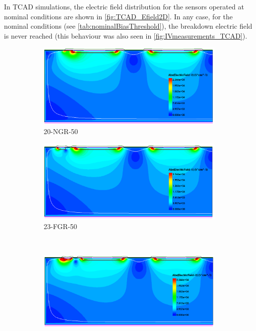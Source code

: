 In TCAD simulations, the electric field distribution for the sensors
operated at nominal conditions are shown in
\cref{fig:TCAD_Efield2D}. In any case, for the nominal conditions (see
\cref{tab:nominalBiasThreshold}), the breakdown electric field is
never reached (this behaviour was also seen in
\cref{fig:IVmeasurements_TCAD}).

\begin{figure}[htbp]
  \centering
  \begin{subfigure}[b]{0.5\textwidth}
    \includegraphics[width=\textwidth]{figures/ActiveEdge/Efield_20_NGR.png}
    \caption{20-NGR-50}
  \end{subfigure}\hfill
  \begin{subfigure}[b]{0.5\textwidth}
    \includegraphics[width=\textwidth]{figures/ActiveEdge/Efield_23_FGR.png}
    \caption{23-FGR-50}
  \end{subfigure} \\
  \begin{subfigure}[b]{0.5\textwidth}
    \includegraphics[width=\textwidth]{figures/ActiveEdge/Efield_28_GNDGR.png}

\end{subfigure}
\end{figure}
